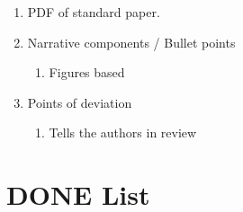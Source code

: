 \documentclass[12pt]{article}
\begin{document}
\begin{enumerate}
\item PDF of standard paper.
\item Narrative components / Bullet points
  \begin{enumerate}
  \item Figures based
  \end{enumerate}
\item Points of deviation
  \begin{enumerate}
  \item Tells the authors in review
  \end{enumerate}
\end{enumerate}


\section{DONE List}




\end{document}
